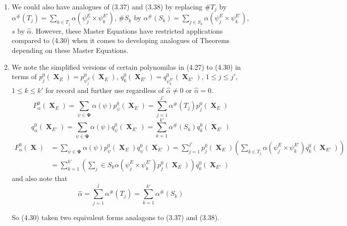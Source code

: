 \documentclass[a4paper,12pt]{article}
\DeclareMathOperator{\x}{\mathrm{X}}
\theoremstyle{definition}
\theoremstyle{underlinethm}
\theoremstyle{definition}
\begin{document}
\begin{enumerate}[label=(\alph*)]
\item We could also have analogues of (3.37) and (3.38)  by replacing $\# T_{j}$ by $\alpha^{\#}(T_{j}) =\sum_{k \in T_{j}} \alpha (\psi_{j}^{E} \times \psi_{k}^{E'})$, $\# S_{k}$ by $\alpha^{\#}(S_{k}) =\sum_{j\in S_{k}} \alpha (\psi_{j}^{E} \times \psi_{k}^{E'})$, $s$ by $\hat{\alpha}$. However, these Master Equations have restricted applications compared to (4.30) when it comes to developing analogues of Theorems depending on these Master Equations.

\item We note the simplified versions of certain polynomilas in (4.27) to (4.30) in terms of $p_{j}^{0}(\boldsymbol{\x}_{E})=p_{\psi^{E}_{j}}^{0}(\boldsymbol{\x}_{E})$, $q_{k}^{0}(\boldsymbol{\x}_{E'}) = q_{\psi^{E'}_{k}}^{0}(\boldsymbol{\x}_{E'})$, $1 \leq j \leq j'$, $1 \leq k \leq k'$ for record and further use regardless of $\hat{\alpha} \neq  0$ or $\hat{\alpha}=0$. 
\begin{equation}
P_{\alpha}^{0}(\boldsymbol{\x}_{E}) = \sum_{\psi \in \boldsymbol{\Psi}} \alpha (\psi) p_{\psi}^{0}(\boldsymbol{\x}_{E}) = \sum_{j=1}^{j'} \alpha^{\#} (T_{j}) p_{j}^{0}(\boldsymbol{\x}_{E})\tag{4.31}\label{eq-4.31}
\end{equation}
\begin{equation}
q_{\alpha}^{0}(\boldsymbol{\x}_{E'}) = \sum_{\psi \in \boldsymbol{\Psi}} \alpha(\psi) q_{\psi}^{0}(\boldsymbol{\x}_{E'}) =\sum_{k=1}^{k'} \alpha^{\#}(S_{k}) q_{k}^{0} (\boldsymbol{\x}_{E'})\tag{4.32}\label{eq-4.32}
\end{equation}
\begin{align*}
F_{\alpha}^{0}(\boldsymbol{\x}) &= \sum_{\psi \in \boldsymbol{\Psi}}\alpha (\psi) p_{\psi}^{0}(\boldsymbol{\x}_{E}) q_{\psi}^{0}(\boldsymbol{\x}_{E'}) = \sum_{j=1}^{j'} p_{j}^{0}(\boldsymbol{\x}_{E}) \left(\sum_{k \in T_{j}} \alpha(\psi_{j}^{E} \times \psi_{k}^{E'}) q_{k}^{0}(\boldsymbol{\x}_{E'})\right)\\
& = \sum_{k=1}^{k'} \left(\sum_{j} \in S_{k} \alpha (\psi_{j}^{E} \times \psi_{k}^{E'}) p_{j}^{0} (\boldsymbol{\x}_{E})\right) q_{k}^{0}(\boldsymbol{\x}_{E'})\tag{4.33}\label{eq-4.33}
\end{align*} 
and also note that
\begin{equation}
\hat{\alpha} = \sum_{j=1}^{j} \alpha^{\#}(T_{j}) = \sum_{k=1}^{k'} \alpha^{\#}(S_{k})\tag{4.34}\label{eq-4.34}
\end{equation}

So (4.30) taken two equivalent forms analagons to (3.37) and (3.38).


\end{enumerate}
\end{document}
